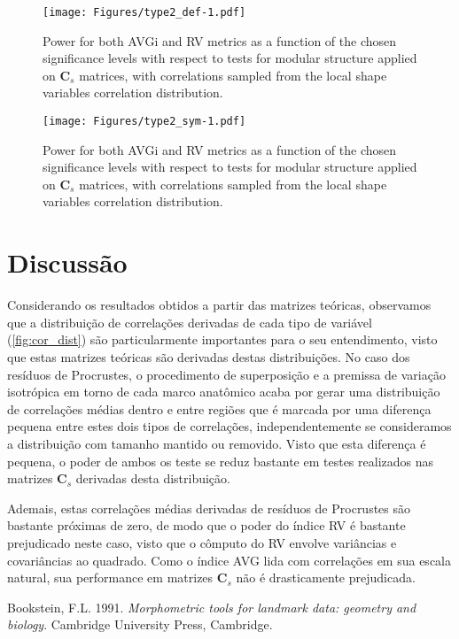 \documentclass[11pt,]{article}
\begin{document}
\begin{figure}[htbp]
\centering
\texttt{[image: Figures/type2\_def-1.pdf]}
\caption{Power for both AVGi and RV metrics as a function of the chosen
significance levels with respect to tests for modular structure applied
on $\mathbf{C}_s$ matrices, with correlations sampled from the local
shape variables correlation distribution. \label{fig:type2_def}}
\end{figure}

\begin{figure}[htbp]
\centering
\texttt{[image: Figures/type2\_sym-1.pdf]}
\caption{Power for both AVGi and RV metrics as a function of the chosen
significance levels with respect to tests for modular structure applied
on $\mathbf{C}_s$ matrices, with correlations sampled from the local
shape variables correlation distribution. \label{fig:type2_sym}}
\end{figure}

\section{Discussão}\label{discussao}

Considerando os resultados obtidos a partir das matrizes teóricas,
observamos que a distribuição de correlações derivadas de cada tipo de
variável (\autoref{fig:cor_dist}) são particularmente importantes para o
seu entendimento, visto que estas matrizes teóricas são derivadas destas
distribuições. No caso dos resíduos de Procrustes, o procedimento de
superposição e a premissa de variação isotrópica em torno de cada marco
anatômico acaba por gerar uma distribuição de correlações médias dentro
e entre regiões que é marcada por uma diferença pequena entre estes dois
tipos de correlações, independentemente se consideramos a distribuição
com tamanho mantido ou removido. Visto que esta diferença é pequena, o
poder de ambos os teste se reduz bastante em testes realizados nas
matrizes $\mathbf{C}_s$ derivadas desta distribuição.

Ademais, estas correlações médias derivadas de resíduos de Procrustes
são bastante próximas de zero, de modo que o poder do índice RV é
bastante prejudicado neste caso, visto que o cômputo do RV envolve
variâncias e covariâncias ao quadrado. Como o índice AVG lida com
correlações em sua escala natural, sua performance em matrizes
$\mathbf{C}_s$ não é drasticamente prejudicada.

Bookstein, F.L. 1991. \emph{Morphometric tools for landmark data:
geometry and biology}. Cambridge University Press, Cambridge.
\end{document}
